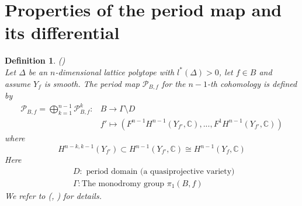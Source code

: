 \documentclass[12pt, english]{article}
\newtheorem{definition}{Definition}[section]
\newtheorem{remark}[definition]{Remark}
\begin{document}
\section{Properties of the period map and its differential} \label{section_period_map_natural_family}



\begin{definition} \label{Def_period_map}
	(\cite[Thm.9.3, Ch.10.1.2, Ch.10.1.3]{Voi02}) \\
	Let $\Delta$ be an $n$-dimensional lattice polytope with $l^*(\Delta) > 0$, let $f \in B$ and assume $Y_f$ is smooth. The period map $\mathcal{P}_{B,f}$ for the $n-1$-th cohomology is defined by
	\begin{align*}
		\mathcal{P}_{B,f} = \bigoplus\limits_{k=1}^{n-1} \mathcal{P}_{B,f}^k: &B \rightarrow \Gamma \setminus D \\
		& f' \mapsto (F^{n-1}H^{n-1}(Y_{f'},\mathbb{C}),...,F^1 H^{n-1}(Y_{f'},\mathbb{C}))
	\end{align*}
	where
	\[ H^{n-k,k-1}(Y_{f'}) \subset H^{n-1}(Y_{f'}, \mathbb{C}) \cong H^{n-1}(Y_f,\mathbb{C})  \]
	Here
	\begin{align*}
		& D: \textrm{ period domain  (a quasiprojective variety) } \\
		& \Gamma: \textrm{The monodromy group } \pi_1(B,f)
	\end{align*}
	We refer to (\cite[Ch.10]{Voi02}, \cite[Ch.3]{Voi03}) for details.
\end{definition}

\end{document}
